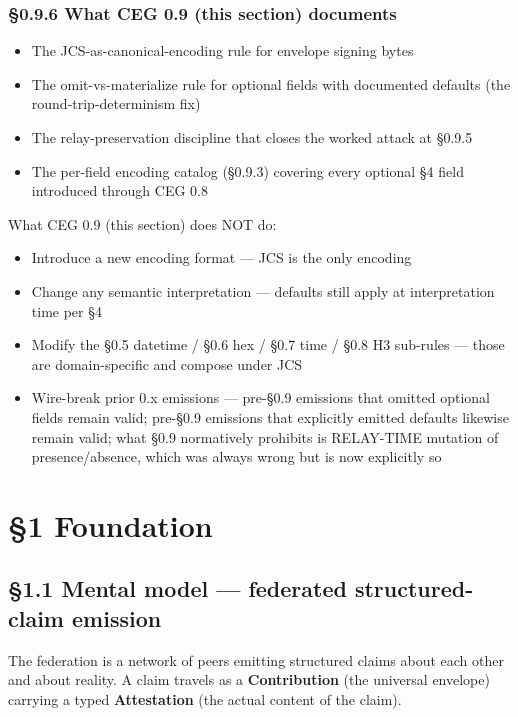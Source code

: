 \documentclass[11pt]{article}
\begin{document}
\subsubsection*{§0.9.6 What CEG 0.9 (this section) documents}


\begin{itemize}\setlength\itemsep{0pt}
\item The JCS-as-canonical-encoding rule for envelope signing bytes
\item The omit-vs-materialize rule for optional fields with documented defaults (the round-trip-determinism fix)
\item The relay-preservation discipline that closes the worked attack at §0.9.5
\item The per-field encoding catalog (§0.9.3) covering every optional §4 field introduced through CEG 0.8
\end{itemize}


What CEG 0.9 (this section) does NOT do:

\begin{itemize}\setlength\itemsep{0pt}
\item Introduce a new encoding format — JCS is the only encoding
\item Change any semantic interpretation — defaults still apply at interpretation time per §4
\item Modify the §0.5 datetime / §0.6 hex / §0.7 time / §0.8 H3 sub-rules — those are domain-specific and compose under JCS
\item Wire-break prior 0.x emissions — pre-§0.9 emissions that omitted optional fields remain valid; pre-§0.9 emissions that explicitly emitted defaults likewise remain valid; what §0.9 normatively prohibits is RELAY-TIME mutation of presence/absence, which was always wrong but is now explicitly so
\end{itemize}




\clearpage


\section*{§1 Foundation}


\subsection*{§1.1 Mental model — federated structured-claim emission}


The federation is a network of peers emitting structured claims about each other and about reality. A claim travels as a \textbf{Contribution} (the universal envelope) carrying a typed \textbf{Attestation} (the actual content of the claim).
\end{document}
